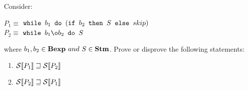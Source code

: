 \newcommand{\exEightA}
{$ \wbS{b_1}{(\ifABC{b_2}{S}{skip})} $}

\newcommand{\exEightB}
{$  \wbS{b_1 \o b_2}{S} $}

{
		Consider: 
	\begin{center}
$ P_1 \equiv $ \exEightA \\
$ P_2 \equiv $ \exEightB
	\end{center}
where $ b_1, b_2 \in\mbox{\textbf{Bexp}}~and~S\in\mbox{\textbf{Stm}}$. Prove or disprove the following statements: 
\begin{enumerate}
	\item $ \mathcal{S} \llbracket P_1 \rrbracket  \sqsupseteq  \mathcal{S} \llbracket P_2  \rrbracket   $
	\item $  \mathcal{S} \llbracket P_2 \rrbracket  \sqsupseteq  \mathcal{S} \llbracket P_1 \rrbracket   $
\end{enumerate}
}
{

}
